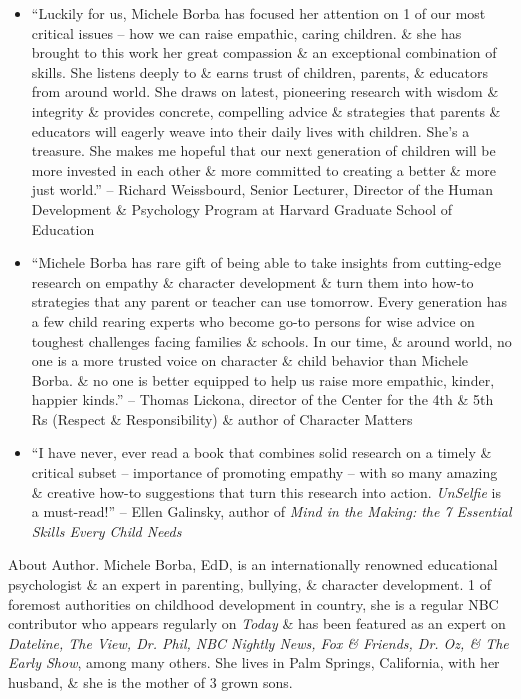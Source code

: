 \documentclass{article}
\begin{document}
\begin{enumerate}
\begin{itemize}
		\item ``Luckily for us, {\sc Michele Borba} has focused her attention on 1 of our most critical issues -- how we can raise empathic, caring children. \& she has brought to this work her great compassion \& an exceptional combination of skills. She listens deeply to \& earns trust of children, parents, \& educators from around world. She draws on latest, pioneering research with wisdom \& integrity \& provides concrete, compelling advice \& strategies that parents \& educators will eagerly weave into their daily lives with children. She's a treasure. She makes me hopeful that our next generation of children will be more invested in each other \& more committed to creating a better \& more just world.'' -- {\sc Richard Weissbourd}, Senior Lecturer, Director of the Human Development \& Psychology Program at Harvard Graduate School of Education
		\item ``{\sc Michele Borba} has rare gift of being able to take insights from cutting-edge research on empathy \& character development \& turn them into how-to strategies that any parent or teacher can use tomorrow. Every generation has a few child rearing experts who become go-to persons for wise advice on toughest challenges facing families \& schools. In our time, \& around world, no one is a more trusted voice on character \& child behavior than {\sc Michele Borba}. \& no one is better equipped to help us raise more empathic, kinder, happier kinds.'' -- {\sc Thomas Lickona}, director of the Center for the 4th \& 5th Rs (Respect \& Responsibility) \& author of {\sc Character Matters}
		\item ``I have never, ever read a book that combines solid research on a timely \& critical subset -- importance of promoting empathy -- with so many amazing \& creative how-to suggestions that turn this research into action. {\it UnSelfie} is a must-read!'' -- {\sc Ellen Galinsky}, author of {\it Mind in the Making: the 7 Essential Skills Every Child Needs}
	\end{itemize}
	{\sf About Author.} {\sc Michele Borba}, EdD, is an internationally renowned educational psychologist \& an expert in parenting, bullying, \& character development. 1 of foremost authorities on childhood development in country, she is a regular NBC contributor who appears regularly on {\it Today}  \& has been featured as an expert on {\it Dateline, The View, Dr. Phil, NBC Nightly News, Fox \& Friends, Dr. Oz, \& The Early Show}, among many others. She lives in Palm Springs, California, with her husband, \& she is the mother of 3 grown sons.	
	

\end{enumerate}
\end{document}
